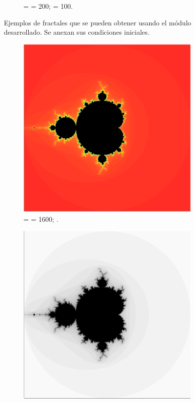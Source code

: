 \begin{figure}
\begin{subfigure}[t]{0.3\textwidth}
        \caption{ =  = 200;  = 100.}
    \end{subfigure}
    \caption{Ejemplos de fractales que se pueden obtener usando el módulo desarrollado. Se anexan sus condiciones iniciales.}
\end{figure}

\begin{figure}
    \centering
    \begin{subfigure}[b]{0.95\textwidth}
        \centering
        \includegraphics[scale=0.3]{../figures/fractal-n1600-mx200}
        \caption{ =  = 1600; .}
    \end{subfigure}
    \begin{subfigure}[b]{0.95\textwidth}
        \centering
        \includegraphics[scale=0.3]{../figures/fractal-n1600-mx040}

\end{subfigure}
\end{figure}
